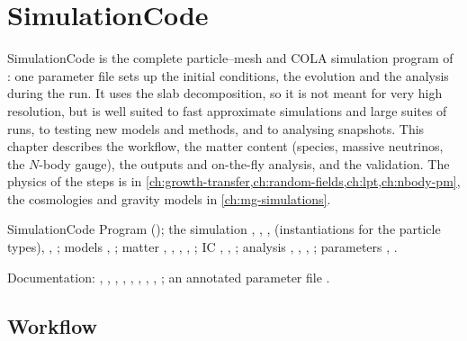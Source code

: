 \chapter{SimulationCode}\label{ch:simulation-code}

SimulationCode is the complete particle--mesh and COLA simulation program of \fml{}: one parameter file sets up the
initial conditions, the evolution and the analysis during the run. It uses the slab decomposition, so it is not meant
for very high resolution, but is well suited to fast approximate simulations and large suites of runs, to testing
new models and methods, and to analysing snapshots. This chapter describes the workflow, the matter content
(species, massive neutrinos, the $N$-body gauge), the outputs and on-the-fly analysis, and the validation. The physics
of the steps is in \cref{ch:growth-transfer,ch:random-fields,ch:lpt,ch:nbody-pm}, the cosmologies and
gravity models in \cref{ch:mg-simulations}.

\begin{modulebox}{SimulationCode}
Program  (); the simulation , ,
,  (instantiations for the particle types), ,
; models , ; matter , ,
, , ; IC ,
, ; analysis , ,
, ; parameters , .\par
Documentation: , , , ,
, , , , ; an
annotated parameter file .
\end{modulebox}

\section{Workflow}\label{sec:sim-workflow}

